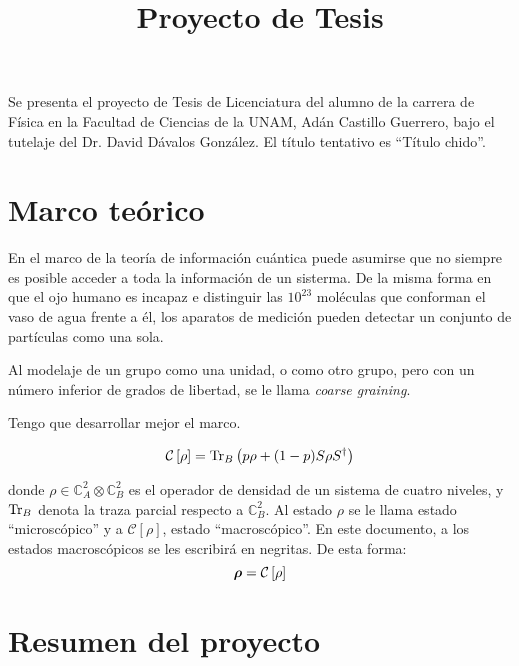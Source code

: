 \documentclass[onecolumn,11pt]{article}
\title{Proyecto de Tesis} \date{}
\newcommand{\Cc}{\mathcal{C}} %
\newcommand{\Hh}{\mathbb{C}} %
\newcommand{\CG}[1]{\Cc\left[#1\right]}
\newcommand*{\B}[1]{\ifmmode\bm{#1}\else\textbf{#1}\fi}
\begin{document}
\maketitle
\thispagestyle{empty}
Se presenta el proyecto de Tesis de Licenciatura del alumno de la carrera de Física en la Facultad de Ciencias de la UNAM, Adán Castillo Guerrero, bajo el tutelaje del Dr. David Dávalos González. El título tentativo es ``Título chido''.

\section{Marco teórico}

En el marco de la teoría de información cuántica puede asumirse que no siempre es posible acceder a toda la información de un sisterma. De la misma forma en que el ojo humano es incapaz e distinguir las $10^{23}$ moléculas que conforman el vaso de agua frente a él, los aparatos de medición pueden detectar un conjunto de partículas como una sola. 

Al modelaje de un grupo como una unidad, o como otro grupo, pero con un número inferior de grados de libertad, se le llama \textit{coarse graining}. 

Tengo que desarrollar mejor el marco.

\begin{equation}\label{eq:CG}
    \Cc\left[\rho\right]=\Tr_{B}\left(p\rho+(1-p)S\rho S^{\dag}\right)
\end{equation}

donde $\rho\in \Hh^{2}_{A}\otimes \Hh^{2}_{B}$ es el operador de densidad de un sistema de cuatro niveles, y $\Tr_{B}$ denota la traza parcial respecto a $\Hh^{2}_{B}$. Al estado $\rho$ se le llama estado ``microscópico'' y a $\CG{\rho}$, estado ``macroscópico''. En este documento, a los estados macroscópicos se les escribirá en negritas. De esta forma:
\begin{equation}
    \B{\rho}=\CG{\rho}
\end{equation}

\vspace{0.5cm}
\section{Resumen del proyecto}
\end{document}
